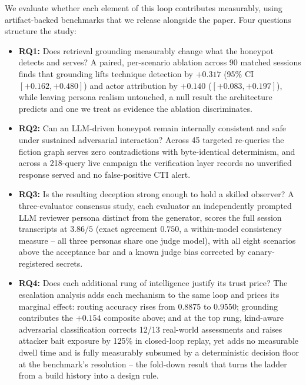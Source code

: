 We evaluate whether each element of this loop contributes measurably,
using
artifact-backed benchmarks that we release alongside the paper. Four
questions structure the study:
\begin{itemize}
\item \textbf{RQ1:} Does retrieval grounding measurably change what the
honeypot detects and serves? A paired, per-scenario ablation across 90
matched sessions finds that grounding lifts technique detection by
$+0.317$ (95\% CI $[+0.162, +0.480]$) and actor attribution by $+0.140$
($[+0.083, +0.197]$), while leaving persona realism untouched, a null
result the architecture predicts and one we treat as evidence the
ablation discriminates.
\item \textbf{RQ2:} Can an LLM-driven honeypot remain internally consistent
and safe under sustained adversarial interaction? Across 45 targeted
re-queries the fiction graph serves zero contradictions with byte-identical
determinism, and across a 218-query live campaign the verification layer
records no unverified response served and no false-positive CTI alert.
\item \textbf{RQ3:} Is the resulting deception strong enough to hold a
skilled observer? A three-evaluator consensus study, each evaluator an
independently prompted LLM reviewer persona distinct from the generator,
scores the full session transcripts at $3.86/5$ (exact agreement
$0.750$, a within-model consistency measure -- all three personas share
one judge model), with all eight scenarios above the acceptance bar and
a known judge bias corrected by canary-registered secrets.
\item \textbf{RQ4:} Does each additional rung of intelligence justify its
trust price? The escalation analysis adds each mechanism
to the same
loop and prices its marginal effect: routing accuracy rises from 0.8875
to 0.9550; grounding contributes the $+0.154$ composite above; and at
the top rung, kind-aware adversarial classification corrects 12/13
real-world assessments and raises attacker bait exposure by 125\% in
closed-loop replay, yet adds no measurable dwell time and is fully
measurably subsumed by a deterministic decision floor at the benchmark's
resolution -- the fold-down result that turns the ladder from a build
history into a design rule.
\end{itemize}

